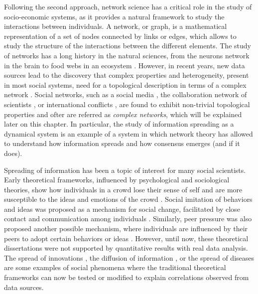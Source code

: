 Following the second approach, network science has a critical role in the study of socio-economic systems, as it provides a natural framework to study the interactions between individuals. A network, or graph, is a mathematical representation of a set of nodes connected by links or edges, which allows to study the structure of the interactions between the different elements. The study of networks has a long history in the natural sciences, from the neurons network in the brain \cite{sporns-2004} to food webs in an ecosystem \cite{ings-2008, elith-2009, bastolla-2009}. However, in recent years, new data sources lead to the discovery that complex properties and heterogeneity, present in most social systems, need for a topological description in terms of a complex network \cite{newman-book, dorogovtsev2002evolution, boccaletti2006complex}. Social networks, such as a social media \cite{dunbar-2015}, the collaboration network of scientists \cite{newman-coll-2001,radicchi-2008}, or international conflicts \cite{hafnerburton-2009, diaz2023network}, are found to exhibit non-trivial topological properties and ofter are referred as \textit{complex networks}, which will be explained later on this chapter. In particular, the study of information spreading as a dynamical system is an example of a system in which network theory has allowed to understand how information spreads and how consensus emerges (and if it does).

Spreading of information has been a topic of interest for many social scientists. Early theoretical frameworks, influenced by psychological and sociological theories, show how individuals in a crowd lose their sense of self and are more susceptible to the ideas and emotions of the crowd \cite{le2023crowd}. Social imitation of behaviors and ideas was proposed as a mechanism for social change, facilitated by close contact and communication among individuals \cite{kanter-1971}. Similarly, peer pressure was also proposed another possible mechanism, where individuals are influenced by their peers to adopt certain behaviors or ideas \cite{granovetter-1978, brown-1986}. However, until now, these theoretical dissertations were not supported by quantitative results with real data analysis. The spread of innovations \cite{rogers2014}, the diffusion of information \cite{valente-1996}, or the spread of diseases \cite{anderson1991infectious} are some examples of social phenomena where the traditional theoretical frameworks can now be tested or modified to explain correlations observed from data sources.

